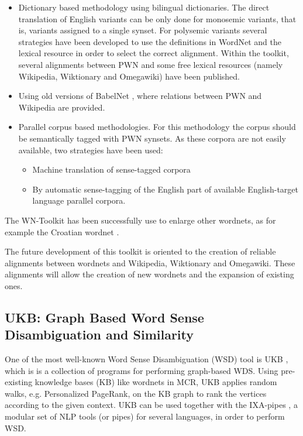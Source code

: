 \documentclass[runningheads]{llncs}
\begin{document}
\begin{itemize}
\item Dictionary based methodology using bilingual dictionaries. The direct translation of English variants can be only done for monosemic variants, that is, variants assigned to a single synset. For polysemic variants several strategies have been developed to use the definitions in WordNet and the lexical resource in order to select the correct alignment. Within the toolkit, several alignments between PWN and some free lexical resources (namely Wikipedia, Wiktionary and Omegawiki) have been published.

\item Using old versions of BabelNet \cite{navigli2010babelnet}, where relations between PWN and Wikipedia are provided.

\item Parallel corpus based methodologies. For this methodology the corpus should be semantically tagged with PWN synsets. As these corpora are not easily available, two strategies have been used:

\begin{itemize}
\item Machine translation of sense-tagged corpora
\item By automatic sense-tagging of the English part of available English-target language parallel corpora.
\end{itemize}
\end{itemize}

The WN-Toolkit has been successfully use to enlarge other wordnets, as for example the Croatian wordnet \cite{oliver2015enlarging}. 

The future development of this toolkit is oriented to the creation of reliable alignments between wordnets and Wikipedia, Wiktionary and Omegawiki. These alignments will allow the creation of new wordnets and the expansion of existing ones.


\subsection{UKB: Graph Based Word Sense Disambiguation and Similarity}


One of the most well-known  Word Sense Disambiguation (WSD) tool is UKB \cite{agirre2018UKB}, which is  is a collection of programs for performing graph-based WDS. Using  pre-existing knowledge bases (KB) like wordnets in MCR,  UKB applies random walks, e.g. Personalized PageRank, on the KB graph to rank the vertices according to the given context. UKB can be used together with the IXA-pipes \cite{agerri2014ixapipes}, a  modular set of NLP tools (or pipes)  for several languages, in order to perform WSD. 
 
\end{document}
